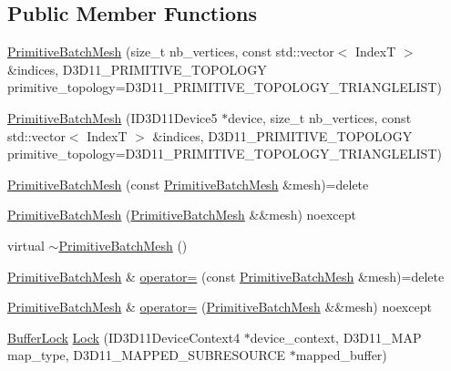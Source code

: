 \subsection*{Public Member Functions}
\begin{DoxyCompactItemize}
\item 
\hyperlink{classmage_1_1_primitive_batch_mesh_a28a2a7c043d384d823bcc27ec44e2434}{Primitive\+Batch\+Mesh} (size\+\_\+t nb\+\_\+vertices, const std\+::vector$<$ IndexT $>$ \&indices, D3\+D11\+\_\+\+P\+R\+I\+M\+I\+T\+I\+V\+E\+\_\+\+T\+O\+P\+O\+L\+O\+GY primitive\+\_\+topology=D3\+D11\+\_\+\+P\+R\+I\+M\+I\+T\+I\+V\+E\+\_\+\+T\+O\+P\+O\+L\+O\+G\+Y\+\_\+\+T\+R\+I\+A\+N\+G\+L\+E\+L\+I\+ST)
\item 
\hyperlink{classmage_1_1_primitive_batch_mesh_a8e6b0c8de7db18855d434aedadef7d22}{Primitive\+Batch\+Mesh} (I\+D3\+D11\+Device5 $\ast$device, size\+\_\+t nb\+\_\+vertices, const std\+::vector$<$ IndexT $>$ \&indices, D3\+D11\+\_\+\+P\+R\+I\+M\+I\+T\+I\+V\+E\+\_\+\+T\+O\+P\+O\+L\+O\+GY primitive\+\_\+topology=D3\+D11\+\_\+\+P\+R\+I\+M\+I\+T\+I\+V\+E\+\_\+\+T\+O\+P\+O\+L\+O\+G\+Y\+\_\+\+T\+R\+I\+A\+N\+G\+L\+E\+L\+I\+ST)
\item 
\hyperlink{classmage_1_1_primitive_batch_mesh_a5480efab72ee64beb3c6444246043459}{Primitive\+Batch\+Mesh} (const \hyperlink{classmage_1_1_primitive_batch_mesh}{Primitive\+Batch\+Mesh} \&mesh)=delete
\item 
\hyperlink{classmage_1_1_primitive_batch_mesh_aa3969f48e75e1c4e4351e971b86a88a6}{Primitive\+Batch\+Mesh} (\hyperlink{classmage_1_1_primitive_batch_mesh}{Primitive\+Batch\+Mesh} \&\&mesh) noexcept
\item 
virtual \hyperlink{classmage_1_1_primitive_batch_mesh_ad229542ea2d314bc055d3f5ed9d08ddb}{$\sim$\+Primitive\+Batch\+Mesh} ()
\item 
\hyperlink{classmage_1_1_primitive_batch_mesh}{Primitive\+Batch\+Mesh} \& \hyperlink{classmage_1_1_primitive_batch_mesh_a700e164eb563db320d232c9596c1a594}{operator=} (const \hyperlink{classmage_1_1_primitive_batch_mesh}{Primitive\+Batch\+Mesh} \&mesh)=delete
\item 
\hyperlink{classmage_1_1_primitive_batch_mesh}{Primitive\+Batch\+Mesh} \& \hyperlink{classmage_1_1_primitive_batch_mesh_a24e963ee76588da4a9c678fc48ca5294}{operator=} (\hyperlink{classmage_1_1_primitive_batch_mesh}{Primitive\+Batch\+Mesh} \&\&mesh) noexcept
\item 
\hyperlink{classmage_1_1_buffer_lock}{Buffer\+Lock} \hyperlink{classmage_1_1_primitive_batch_mesh_a35847b2f8b5d442f44d3695aeb8bf6be}{Lock} (I\+D3\+D11\+Device\+Context4 $\ast$device\+\_\+context, D3\+D11\+\_\+\+M\+AP map\+\_\+type, D3\+D11\+\_\+\+M\+A\+P\+P\+E\+D\+\_\+\+S\+U\+B\+R\+E\+S\+O\+U\+R\+CE $\ast$mapped\+\_\+buffer)
\end{DoxyCompactItemize}
